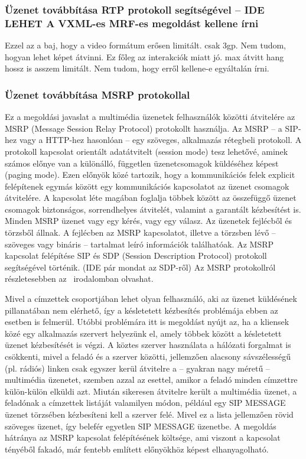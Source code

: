 \subsubsection{Üzenet továbbítása RTP protokoll segítségével -- {\color{red}IDE LEHET A VXML-es MRF-es megoldást kellene írni}}

{\color{red}Ezzel az a baj, hogy a video formátum erősen limitált. csak 3gp. Nem tudom, hogyan lehet képet átvinni. Ez főleg az interakciók miatt jó. max átvitt hang hossz is asszem limitált. Nem tudom, hogy erről kellene-e egyáltalán írni.}


\subsubsection{Üzenet továbbítása MSRP protokollal}
\label{sec:msrp_message}

Ez a megoldási javaslat a multimédia üzenetek felhasználók közötti átvitelére az MSRP (Message Session Relay Protocol) protokollt használja. Az MSRP -- a SIP-hez vagy a HTTP-hez hasonlóan -- egy szöveges, alkalmazás rétegbeli protokoll. A protokoll kapcsolat orientált adatátvitelt (session mode) tesz lehetővé, aminek számos előnye van a különálló, független üzenetcsomagok küldéséhez képest (paging mode).
Ezen előnyök közé tartozik, hogy a kommunikációs felek explicit felépítenek egymás között egy kommunikációs kapcsolatot az üzenet csomagok átvitelére. A kapcsolat léte magában foglalja többek között az összefüggő üzenet csomagok biztonságos, sorrendhelyes átvitelét, valamint a garantált kézbesítést is. Minden MSRP üzenet vagy egy kérés, vagy egy válasz. Az üzenetek fejlécből és törzsből állnak. A fejlécben az MSRP kapcsolatot, illetve a törzsben lévő -- szöveges vagy bináris -- tartalmat leíró információk találhatóak. Az MSRP kapcsolat felépítése SIP és SDP (Session Description Protocol) protokoll~\cite{rfc4566} segítségével történik. {\color{red} (IDE pár mondat az SDP-ről)} Az MSRP protokollról részletesebben az~\cite{rfc4975} irodalomban olvashat. 

Mivel a címzettek csoportjában lehet olyan felhasználó, aki az üzenet küldésének pillanatában nem elérhető, így a késletetett kézbesítés problémája ebben az esetben is felmerül. Utóbbi problémára itt is megoldást nyújt az, ha a kliensek közé egy alkalmazás szervert helyezünk el, amely többek között a késletetett üzenet kézbesítését is végzi. A köztes szerver használata a hálózati forgalmat is csökkenti, mivel a feladó és a szerver közötti, jellemzően alacsony sávszélességű (pl. rádiós) linken csak egyszer kerül átvitelre a -- gyakran nagy méretű -- multimédia üzenetet, szemben azzal az esettel, amikor a feladó minden címzettre külön-külön elküldi azt. Miután sikeresen átvitelre került a multimédia üzenet, a feladónak a címzettek listáját valamilyen módon, például egy SIP MESSAGE üzenet törzsében kézbesíteni kell a szerver felé. Mivel ez a lista jellemzően rövid szöveges üzenet, így belefér egyetlen SIP MESSAGE üzenetbe. A megoldás hátránya az MSRP kapcsolat felépítésének költsége, ami viszont a kapcsolat tényéből fakadó, már fentebb említett előnyökhöz képest elhanyagolható.

